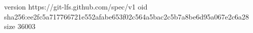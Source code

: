 version https://git-lfs.github.com/spec/v1
oid sha256:ee2fc5a717766721e552afabe653f02c564a5bac2c5b7a8be6d95a067e2c6a28
size 36003
